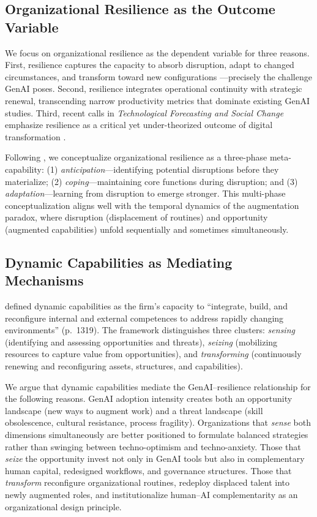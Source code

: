 \documentclass[12pt, a4paper]{article}
\begin{document}
\subsection{Organizational Resilience as the Outcome Variable}

We focus on organizational resilience as the dependent variable for three reasons. First, resilience captures the capacity to absorb disruption, adapt to changed circumstances, and transform toward new configurations \citep{Duchek2020}---precisely the challenge GenAI poses. Second, resilience integrates operational continuity with strategic renewal, transcending narrow productivity metrics that dominate existing GenAI studies. Third, recent calls in \textit{Technological Forecasting and Social Change} emphasize resilience as a critical yet under-theorized outcome of digital transformation \citep{Vrontis2022, Zeng2025}.

Following \citet{Duchek2020}, we conceptualize organizational resilience as a three-phase meta-capability: (1) \textit{anticipation}---identifying potential disruptions before they materialize; (2) \textit{coping}---maintaining core functions during disruption; and (3) \textit{adaptation}---learning from disruption to emerge stronger. This multi-phase conceptualization aligns well with the temporal dynamics of the augmentation paradox, where disruption (displacement of routines) and opportunity (augmented capabilities) unfold sequentially and sometimes simultaneously.

\subsection{Dynamic Capabilities as Mediating Mechanisms}

\citet{Teece2007} defined dynamic capabilities as the firm's capacity to ``integrate, build, and reconfigure internal and external competences to address rapidly changing environments'' (p.~1319). The framework distinguishes three clusters: \textit{sensing} (identifying and assessing opportunities and threats), \textit{seizing} (mobilizing resources to capture value from opportunities), and \textit{transforming} (continuously renewing and reconfiguring assets, structures, and capabilities).

We argue that dynamic capabilities mediate the GenAI--resilience relationship for the following reasons. GenAI adoption intensity creates both an opportunity landscape (new ways to augment work) and a threat landscape (skill obsolescence, cultural resistance, process fragility). Organizations that \textit{sense} both dimensions simultaneously are better positioned to formulate balanced strategies rather than swinging between techno-optimism and techno-anxiety. Those that \textit{seize} the opportunity invest not only in GenAI tools but also in complementary human capital, redesigned workflows, and governance structures. Those that \textit{transform} reconfigure organizational routines, redeploy displaced talent into newly augmented roles, and institutionalize human--AI complementarity as an organizational design principle.
\end{document}
